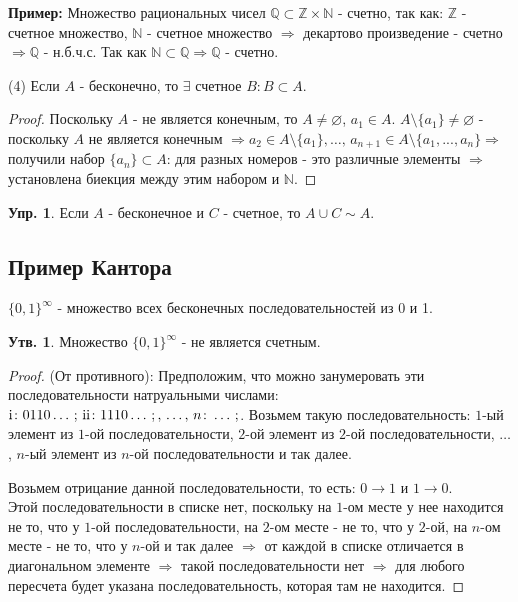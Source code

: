 \documentclass[12pt]{article}
\newcommand{\RN}[1]{%
	\textup{\uppercase\expandafter{\romannumeral#1}}%
}
\theoremstyle{definition}
\newtheorem{prop}{Утв.}
\newtheorem{exrc}{Упр.}
\begin{document}
\textbf{Пример:} Множество рациональных чисел $\mathbb{Q} \subset \mathbb{Z} \times \mathbb{N}$ - счетно, так как: $\mathbb{Z}$ - счетное множество, $\mathbb{N}$ - счетное множество $\Rightarrow$ декартово произведение - счетно $\Rightarrow \mathbb{Q}$ - н.б.ч.с. Так как $\mathbb{N} \subset \mathbb{Q} \Rightarrow \mathbb{Q}$ - счетно.

(4) Если $A$ - бесконечно, то $\exists$ счетное $B \colon B \subset A$.
\begin{proof}
	Поскольку $A$ - не является конечным, то $A \neq \varnothing$, $a_1 \in A$. $A \setminus \{a_1\} \neq \varnothing$ - поскольку $A$ не является конечным $\Rightarrow a_2 \in A\setminus\{a_1\}, \dotsc,\, a_{n+1} \in A \setminus\{a_1, ... , a_n\} \Rightarrow$ получили набор $\{a_n\} \subset A$: для разных номеров - это различные элементы $\Rightarrow$ установлена биекция между этим набором и $\mathbb{N}$.
\end{proof}

\begin{exrc}
	 Если $A$ - бесконечное и $C$ - счетное, то $A \cup C \sim A$.
\end{exrc}
 
\subsection*{Пример Кантора}
$\{0,1\}^{\infty}$ - множество всех бесконечных последовательностей из 0 и 1. 

\begin{prop}
	Множество $\{0,1\}^{\infty}$ - не является счетным.
\end{prop}
\begin{proof}
(От противного): Предположим, что можно занумеровать эти последовательности натруальными числами: $\RN{1}\colon 0110\dotsc;\, \RN{2}\colon 1110\dotsc;, \, \dotsc,\, n\colon \dotsc;$.
Возьмем такую последовательность: $1$-ый элемент из $1$-ой последовательности, $2$-ой элемент из $2$-ой последовательности, $\dotsc$, $n$-ый элемент из $n$-ой последовательности и так далее.

Возьмем отрицание данной последовательности, то есть: $0 \rightarrow 1$ и $1 \rightarrow 0$.\\
Этой последовательности в списке нет, поскольку на $1$-ом месте у нее находится не то, что у $1$-ой последовательности, на $2$-ом месте - не то, что у $2$-ой, на $n$-ом месте - не то, что у $n$-ой и так далее $\Rightarrow$ от каждой в списке отличается в диагональном элементе $\Rightarrow$ такой последовательности нет $\Rightarrow$ для любого пересчета будет указана последовательность, которая там не находится.
\end{proof} 
\end{document}
